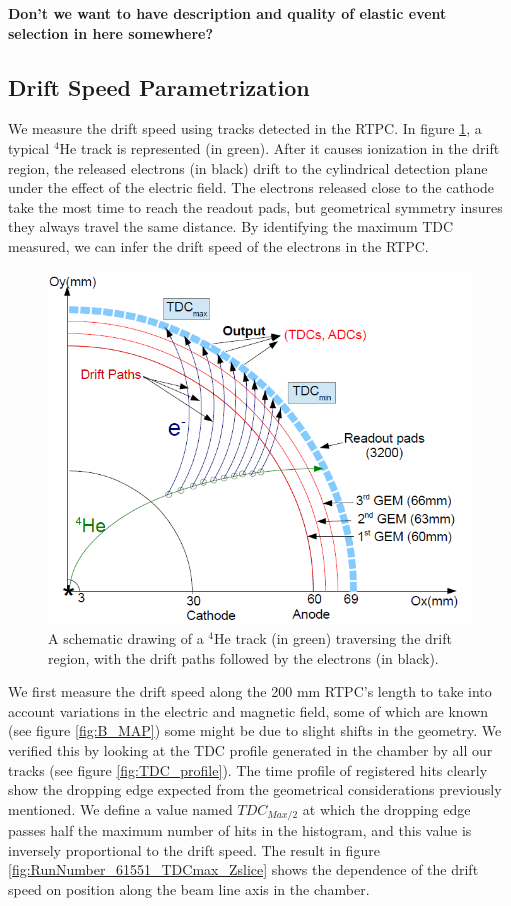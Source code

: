 \documentclass[twocolumn,showpacs,superscriptaddress,groupedaddress]{revtex4}
\begin{document}
{\bf Don't we want to have description and quality of elastic event selection in here somewhere?}

\subsection{Drift Speed Parametrization}

We measure the drift speed using tracks detected in the RTPC. In figure 
\ref{fig:RTPC_signals}, a typical $^{4}$He track is represented (in green). After 
it causes ionization in the drift region, the released electrons (in black) 
drift to the cylindrical detection plane under the effect of the electric field. The 
electrons released close to the cathode take the most time to reach the readout 
pads, but geometrical symmetry insures they always travel the same 
distance. By identifying the maximum TDC measured, we can infer the drift 
speed of the electrons in the RTPC.\\

\begin{figure}[tb]
\centering
\includegraphics[scale=0.35]{fig/RTPC_2.png}
\caption[]{A schematic drawing of a $^{4}$He track (in green) traversing the 
drift region, with the drift paths followed by the electrons (in black). } 
\label{fig:RTPC_signals}
\end{figure}

We first measure the drift speed along the 200 mm RTPC's length to take into 
account variations in the electric and magnetic field, some of which are known 
(see figure \ref{fig:B_MAP}) some might be due to slight shifts in the 
geometry. We verified this by looking at the TDC profile generated in the 
chamber by all our tracks (see figure \ref{fig:TDC_profile}). The time profile 
of registered hits clearly show the dropping edge expected from the geometrical 
considerations previously mentioned. We define a value named $TDC_{Max/2}$ at 
which the dropping edge passes half the maximum number of hits in the 
histogram, and this value is inversely proportional to the drift speed. The
result in figure \ref{fig:RunNumber_61551_TDCmax_Zslice} shows the dependence of
the drift speed on position along the beam line axis in the chamber. 
\end{document}

